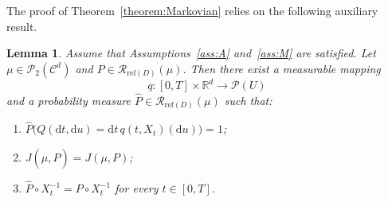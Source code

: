 \documentclass[11pt,amsfonts]{article}
\theoremstyle{plain}
\newtheorem{lemma}{Lemma}
\theoremstyle{assumpstyle}
\numberwithin{equation}{section}
\numberwithin{theorem}{section}
\numberwithin{proposition}{section}
\numberwithin{definition}{section}
\numberwithin{remark}{section}
\numberwithin{corollary}{section}
\numberwithin{lemma}{section}
\begin{document}
The proof of Theorem~\ref{theorem:Markovian} relies on the following auxiliary result.

\begin{lemma}\label{lemma:adj-Markovian}
Assume that Assumptions~\ref{ass:A} and~\ref{ass:M} are satisfied. 
Let $\mu \in \mathcal{P}_2(\mathcal{C}^d)$ and $P \in \mathcal{R}_{\mathrm{ref}(D)}(\mu)$. 
Then there exist a measurable mapping 
\begin{equation*}
q : [0, T] \times \mathbb{R}^d \longrightarrow \mathcal{P}(U)
\end{equation*}
and a probability measure $\hat{P} \in \mathcal{R}_{\mathrm{ref}(D)}(\mu)$ such that:
\begin{enumerate}[label=(\roman*)]
    \item $\hat{P}\big(Q(\mathrm{d}t, \mathrm{d}u) = \mathrm{d}t\, q(t,X_t)(\mathrm{d}u)\big) = 1$;
    \item $J(\mu, \hat{P}) = J(\mu, P)$;
    \item $\hat{P} \circ X_t^{-1} = P \circ X_t^{-1}$ for every $t \in [0, T]$.
\end{enumerate}
\end{lemma}
\end{document}
